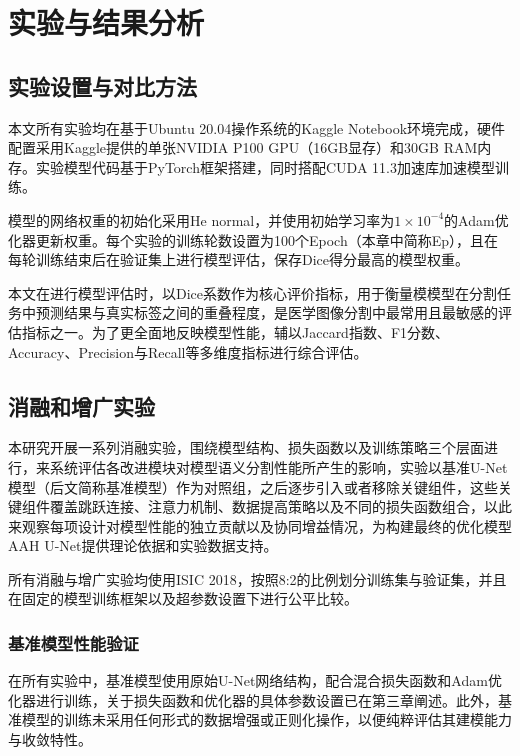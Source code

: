 \section{实验与结果分析}

\subsection{实验设置与对比方法}

本文所有实验均在基于Ubuntu 20.04操作系统的Kaggle Notebook环境完成，硬件配置采用Kaggle提供的单张NVIDIA P100 GPU（16GB显存）和30GB RAM内存。实验模型代码基于PyTorch框架搭建，同时搭配CUDA 11.3加速库加速模型训练。

模型的网络权重的初始化采用He normal，并使用初始学习率为$1 \times 10^{-4}$的Adam优化器更新权重。每个实验的训练轮数设置为100个Epoch（本章中简称Ep），且在每轮训练结束后在验证集上进行模型评估，保存Dice得分最高的模型权重。

本文在进行模型评估时，以Dice系数作为核心评价指标，用于衡量模模型在分割任务中预测结果与真实标签之间的重叠程度，是医学图像分割中最常用且最敏感的评估指标之一。为了更全面地反映模型性能，辅以Jaccard指数、F1分数、Accuracy、Precision与Recall等多维度指标进行综合评估。

\subsection{消融和增广实验}

本研究开展一系列消融实验，围绕模型结构、损失函数以及训练策略三个层面进行，来系统评估各改进模块对模型语义分割性能所产生的影响，实验以基准U-Net模型（后文简称基准模型）作为对照组，之后逐步引入或者移除关键组件，这些关键组件覆盖跳跃连接、注意力机制、数据提高策略以及不同的损失函数组合，以此来观察每项设计对模型性能的独立贡献以及协同增益情况，为构建最终的优化模型AAH U-Net提供理论依据和实验数据支持。

所有消融与增广实验均使用ISIC 2018，按照8:2的比例划分训练集与验证集，并且在固定的模型训练框架以及超参数设置下进行公平比较。

\subsubsection{基准模型性能验证}

在所有实验中，基准模型使用原始U-Net网络结构，配合混合损失函数和Adam优化器进行训练，关于损失函数和优化器的具体参数设置已在第三章阐述。此外，基准模型的训练未采用任何形式的数据增强或正则化操作，以便纯粹评估其建模能力与收敛特性。

